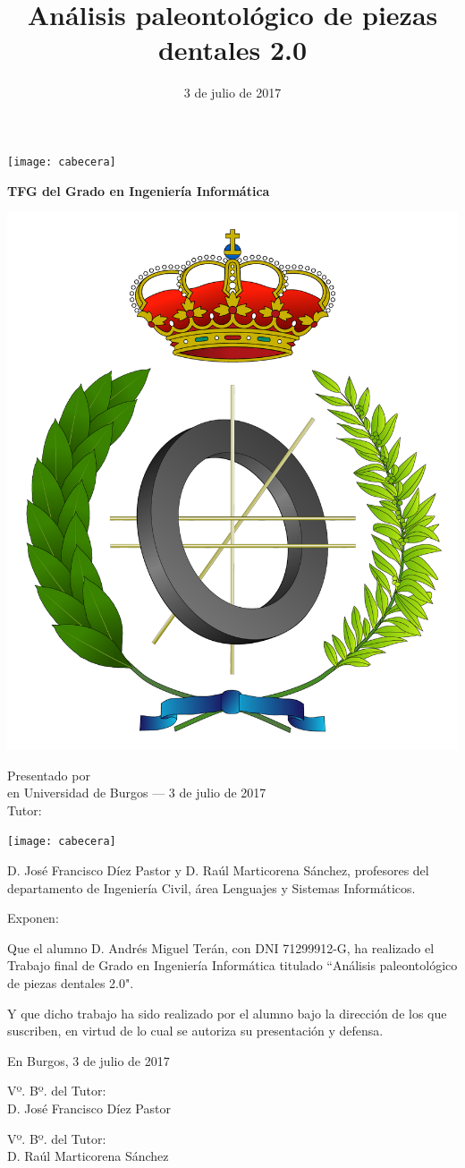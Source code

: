 \documentclass[a4paper,11pt,twoside]{memoir}
\title{Análisis paleontológico de piezas dentales 2.0}
\author{\nombre}
\date{3 de julio de 2017}
\makeatletter
\def\maketitle{
  \null
  \thispagestyle{empty}
\noindent\texttt{[image: cabecera]}\vspace{1cm}%
  \vfill
  \colorbox{cpardoBox}{%
    \begin{minipage}{.8\textwidth}
      \vspace{.5cm}\Large
      \begin{center}
      \textbf{TFG del Grado en Ingeniería Informática}\vspace{.6cm}\\
      \textbf{\LARGE\@title{}}
      \end{center}
      \vspace{.2cm}
    \end{minipage}

  }%
  \hfill
  \begin{minipage}{.20\textwidth}
    \includegraphics[width=\textwidth]{escudoInfor}
  \end{minipage}
  \vfill
  \begin{center}%
  {%
    \noindent\LARGE
    Presentado por \@author{}\\ 
    en Universidad de Burgos --- 3 de julio de 2017\\
    Tutor: \@tutor{}\\
  }%
  \end{center}%
  \null
  \cleardoublepage
  }
\newcommand{\nombre}{Andrés Miguel Terán} %
\makeatother
\begin{document}
\maketitle




\thispagestyle{empty}


\noindent\texttt{[image: cabecera]}\vspace{1cm}

\noindent D. José Francisco Díez Pastor y D. Raúl Marticorena Sánchez, profesores del departamento de Ingeniería Civil, área Lenguajes y Sistemas Informáticos.

\noindent Exponen:

\noindent Que el alumno D. \nombre, con DNI 71299912-G, ha realizado el Trabajo final de Grado en Ingeniería Informática titulado ``Análisis paleontológico de piezas dentales 2.0". 

\noindent Y que dicho trabajo ha sido realizado por el alumno bajo la dirección de los que suscriben, en virtud de lo cual se autoriza su presentación y defensa. 

\begin{center} %
En Burgos, 3 de julio de 2017
\end{center}

\vfill\vfill\vfill

\begin{minipage}{0.45\textwidth}
\begin{flushleft} %
Vº. Bº. del Tutor:\\[2cm] 
D. José Francisco Díez Pastor
\end{flushleft}
\end{minipage}
\hfill
\begin{minipage}{0.45\textwidth}
\begin{flushleft} %
Vº. Bº. del Tutor:\\[2cm]
D. Raúl Marticorena Sánchez
\end{flushleft}
\end{minipage}
\hfill

\vfill



\newpage\null\thispagestyle{empty}
\end{document}
